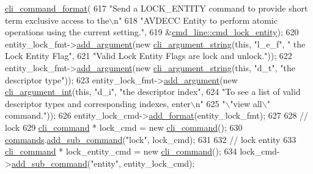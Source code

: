 \begin{DoxyCode}
      \hyperlink{classcli__command__format}{cli\_command\_format}(
617         \textcolor{stringliteral}{"Send a LOCK\_ENTITY command to provide short term exclusive access to the\(\backslash\)n"}
618         \textcolor{stringliteral}{"AVDECC Entity to perform atomic operations using the current setting."},
619         &\hyperlink{classcmd__line_a37344636c6334274b9dabb8f4a447ab0}{cmd\_line::cmd\_lock\_entity});
620     entity\_lock\_fmt->\hyperlink{classcli__command__format_ac3fc6d13a227c195d5ee6f7b78eba9cd}{add\_argument}(\textcolor{keyword}{new} \hyperlink{classcli__argument__string}{cli\_argument\_string}(\textcolor{keyword}{this}, \textcolor{stringliteral}{"l\_e\_f"}, \textcolor{stringliteral}{"
      the Lock Entity Flag"},
621                                                           \textcolor{stringliteral}{"Valid Lock Entity Flags are lock and unlock."}));
622     entity\_lock\_fmt->\hyperlink{classcli__command__format_ac3fc6d13a227c195d5ee6f7b78eba9cd}{add\_argument}(\textcolor{keyword}{new} \hyperlink{classcli__argument__string}{cli\_argument\_string}(\textcolor{keyword}{this}, \textcolor{stringliteral}{"d\_t"}, \textcolor{stringliteral}{"the
       descriptor type"}));
623     entity\_lock\_fmt->\hyperlink{classcli__command__format_ac3fc6d13a227c195d5ee6f7b78eba9cd}{add\_argument}(\textcolor{keyword}{new} \hyperlink{classcli__argument__int}{cli\_argument\_int}(\textcolor{keyword}{this}, \textcolor{stringliteral}{"d\_i"}, \textcolor{stringliteral}{"the
       descriptor index"},
624                                                        \textcolor{stringliteral}{"To see a list of valid descriptor types and
       corresponding indexes, enter\(\backslash\)n"}
625                                                        \textcolor{stringliteral}{"\(\backslash\)"view all\(\backslash\)" command."}));
626     entity\_lock\_cmd->\hyperlink{classcli__command_aa9ec38e761644d946f8db2b920e39921}{add\_format}(entity\_lock\_fmt);
627 
628     \textcolor{comment}{// lock}
629     \hyperlink{classcli__command}{cli\_command} * lock\_cmd = \textcolor{keyword}{new} \hyperlink{classcli__command}{cli\_command}();
630     \hyperlink{classcmd__line_ae4fea670c2fdd2b60f7b5b6ad6fbaf1e}{commands}.\hyperlink{classcli__command_aa73a67e8ebb6facd4b40ced66279b226}{add\_sub\_command}(\textcolor{stringliteral}{"lock"}, lock\_cmd);
631 
632     \textcolor{comment}{// lock entity}
633     \hyperlink{classcli__command}{cli\_command} * lock\_entity\_cmd = \textcolor{keyword}{new} \hyperlink{classcli__command}{cli\_command}();
634     lock\_cmd->\hyperlink{classcli__command_aa73a67e8ebb6facd4b40ced66279b226}{add\_sub\_command}(\textcolor{stringliteral}{"entity"}, entity\_lock\_cmd);

\end{DoxyCode}
